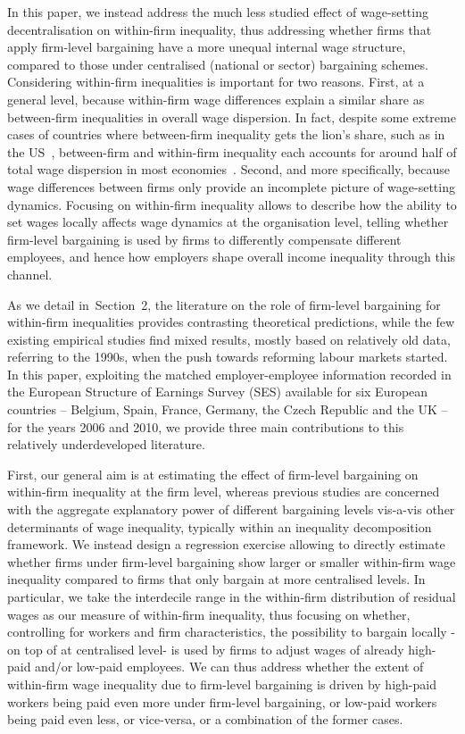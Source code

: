 \documentclass[12pt]{article}
\begin{document}
In this paper, we instead address the much less studied effect of wage-setting decentralisation on within-firm inequality, thus addressing whether firms that apply firm-level bargaining have a more unequal internal wage structure, compared to those under centralised (national or sector) bargaining schemes. Considering within-firm inequalities is important for two reasons. First, at a general level, because within-firm wage differences explain a similar share as between-firm inequalities in overall wage dispersion. In fact, despite some extreme cases of countries where between-firm inequality gets the lion's share, such as in the US~\citep{barthetal_2016}, between-firm and within-firm inequality each accounts for around half of total wage dispersion in most economies~\citep{lazear.shaw.2007,fournier.koske.2013,GlobalWageReport,criscuolo2020}. Second, and more specifically, because wage differences between firms only provide an incomplete picture of wage-setting dynamics. Focusing on within-firm inequality allows to describe how the ability to set wages locally affects wage dynamics at the organisation level, telling whether firm-level bargaining is used by firms to differently compensate different employees, and hence how employers shape overall income inequality through this channel. 

As we detail in~Section~2, the literature on the role of firm-level bargaining for within-firm inequalities provides contrasting theoretical predictions, while the few existing empirical studies find mixed results, mostly based on relatively old data, referring to the 1990s, when the push towards reforming labour markets started. In this paper, exploiting the matched employer-employee information recorded in the European Structure of Earnings Survey (SES) available for six European countries -- Belgium, Spain, France, Germany, the Czech Republic and the UK -- for the years 2006 and 2010, we provide three main contributions to this relatively underdeveloped literature.  

First, our general aim is at estimating the effect of firm-level bargaining on within-firm inequality at the firm level, whereas previous studies are concerned with the aggregate explanatory power of different bargaining levels vis-a-vis other determinants of wage inequality, typically within an inequality decomposition framework. We instead design a regression exercise allowing to directly estimate whether firms under firm-level bargaining show larger or smaller within-firm wage inequality compared to firms that only bargain at more centralised levels. In particular, we take the interdecile range in the within-firm distribution of residual wages as our measure of within-firm inequality, thus focusing on whether, controlling for workers and firm characteristics, the possibility to bargain locally -on top of at centralised level- is used by firms to adjust wages of already high-paid and/or low-paid employees. We can thus address whether the extent of within-firm wage inequality due to firm-level bargaining is driven by high-paid workers being paid even more under firm-level bargaining, or low-paid workers being paid even less, or vice-versa, or a combination of the former cases.
\end{document}
